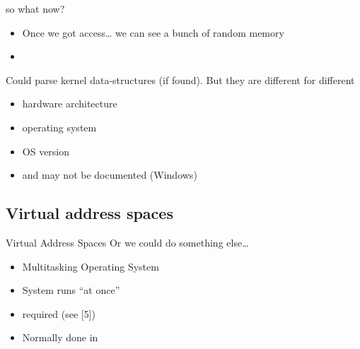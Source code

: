 \documentclass{beamer}
\newenvironment{itemizeframe}[1]
  {\begin{frame}{#1}\startitemizeframe}
  {\stopitemizeframe\end{frame}}
\newcommand\startitemizeframe{\begin{itemize}}
\newcommand\stopitemizeframe{\end{itemize}}
\begin{document}
	\begin{itemizeframe}{so what now?}
		\item Once we got access\ldots
			we can see a bunch of random memory

		\item {}
	\end{itemizeframe}

	\begin{frame}
		Could parse kernel data-structures (if found). But they are different for different
		\begin{itemize}
			\item hardware architecture
			\item operating system
			\item OS version
			\item and may not be documented (Windows)
		\end{itemize}
	\end{frame}

	\subsection{Virtual address spaces}

		\begin{frame}{Virtual Address Spaces}
			Or we could do something else\ldots
			\begin{itemize}
				\item Multitasking Operating System
				\item System runs  ``at once''
				\item {} required (see [5])
				\item Normally done in 
			\end{itemize}
		\end{frame}
\end{document}

